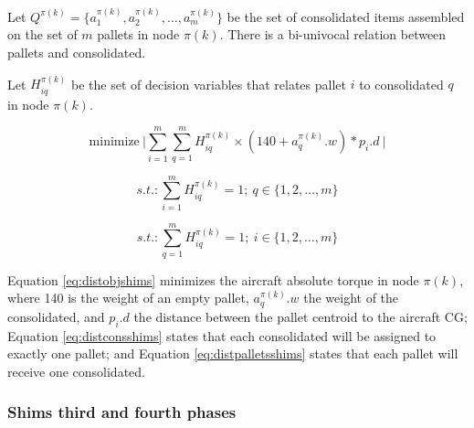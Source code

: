 \documentclass[preprint,authoryear]{elsarticle}
\begin{document}
Let $Q^{\pi(k)}  = \{ a^{\pi(k)}_1, a^{\pi(k)}_2, \ldots, a^{\pi(k)}_m \}$ be the set of consolidated items assembled on the set of $m$ pallets in node $\pi(k)$. There is a bi-univocal relation between pallets and consolidated.

Let $H^{\pi(k)}_{iq}$ be the set of decision variables that relates pallet $i$ to consolidated $q$ in node $\pi(k)$.

\begin{equation} \label{eq:distobjshims}
	\mbox{minimize}\ \Bigg |  \sum_{i=1}^{m} \sum_{q=1}^{m} H^{\pi(k)}_{iq} \times  (140 + a^{\pi(k)}_q.w) * p_i.d\ \Bigg | 
\end{equation}

\begin{equation} \label{eq:distconsshims}
	s.t.: \sum_{i=1}^{m} H^{\pi(k)}_{iq} = 1;\ q \in \{1,2,\ldots,m\}
\end{equation}

\begin{equation} \label{eq:distpalletsshims}
	s.t.: \sum_{q=1}^{m} H^{\pi(k)}_{iq}=1;\ i \in \{1,2,\ldots,m\}
\end{equation}

Equation \ref{eq:distobjshims} minimizes the aircraft absolute torque in node $\pi(k)$, where 140 is the weight of an empty pallet, $a^{\pi(k)}_q.w$ the weight of the consolidated, and $p_i.d$ the distance between the pallet centroid to the aircraft CG; Equation \ref{eq:distconsshims} states that each consolidated will be assigned to exactly one pallet; and Equation \ref{eq:distpalletsshims} states that each pallet will receive one consolidated.


\subsubsection{Shims third and fourth phases}
\end{document}
